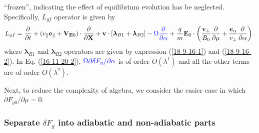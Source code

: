\documentclass{article}
\newcommand{\tmcolor}[2]{{\color{#1}{#2}}}
\newcommand{\tmmathbf}[1]{\ensuremath{\boldsymbol{#1}}}
\begin{document}
``frozen'', indicating the effect of equilibrium evolution has be neglected.
Specifically, $L_{g f}$ operator is given by
\begin{equation}
  L_{g f} = \frac{\partial}{\partial t} + (v_{\parallel}
  \mathbf{e}_{\parallel} +\mathbf{V}_{\mathbf{E}0}) \cdot
  \frac{\partial}{\partial \mathbf{X}} +\mathbf{v} \cdot
  [\tmmathbf{\lambda}_{B 1} +\tmmathbf{\lambda}_{B 2}] - \tmcolor{blue}{\Omega
  \frac{\partial}{\partial \alpha}} + \frac{q}{m} \mathbf{E}_0 \cdot \left(
  \frac{\mathbf{v}_{\perp}}{B_0}  \frac{\partial}{\partial \mu} +
  \frac{\tmmathbf{e}_{\alpha}}{v_{\perp}}  \frac{\partial}{\partial \alpha}
  \right) .
\end{equation}
where $\tmmathbf{\lambda}_{B 1}$ and $\tmmathbf{\lambda}_{B 2}$ operators are
given by expression (\ref{18-9-16-1}) and (\ref{18-9-16-2}). In Eq.
(\ref{16-11-20-2}), $\tmcolor{blue}{\Omega \partial \delta F_g / \partial
\alpha}$ is of order $O (\lambda^1)$ and all the other terms are of order $O
(\lambda^2)$.

Next, to reduce the complexity of algebra, we consider the easier case in
which $\partial F_{g 0} / \partial \mu = 0$.

\subsubsection{Separate $\delta F_g$ into adiabatic and non-adiabatic parts}
\end{document}
